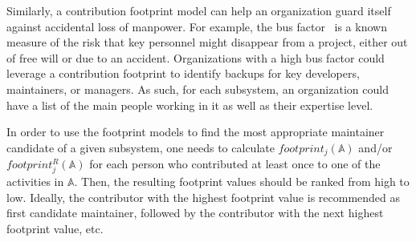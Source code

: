 Similarly, a contribution footprint model can help an organization guard itself against accidental loss of manpower. For example, the bus factor~\cite{Mens2014} is a known measure of the risk that key personnel might disappear from a project, either out of free will or due to an accident. Organizations with a high bus factor could leverage a contribution footprint to identify backups for key developers, maintainers, or managers. As such, for each subsystem, an organization could have a list of the main people working in it as well as their expertise level.

In order to use the footprint models to find the most appropriate maintainer candidate of a given subsystem, one needs to calculate $footprint_j(\mathbb{A})$ and/or $footprint_j^R(\mathbb{A})$ for each person who contributed at least once to one of the activities in $\mathbb{A}$. Then, the resulting footprint values should be ranked from high to low. Ideally, the contributor with the highest footprint value is recommended as first candidate maintainer, followed by the contributor with the next highest footprint value, etc.%




